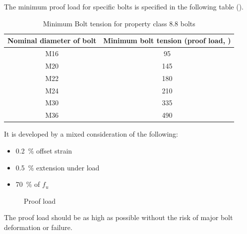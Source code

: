 The minimum proof load for specific bolts is specified in the following table ().
\begin{table}[H]\centering\footnotesize\caption{Minimum Bolt tension for property class 8.8 bolts}
\begin{tabular}{cc}
	\toprule
	Nominal diameter of bolt & Minimum bolt tension (proof load, \si{\kn}) \\ \midrule
	          M16            &                     95                      \\
	          M20            &                     145                     \\
	          M22            &                     180                     \\
	          M24            &                     210                     \\
	          M30            &                     335                     \\
	          M36            &                     490                     \\ \bottomrule
\end{tabular}
\end{table}
It is developed by a mixed consideration of the following:
\begin{itemize}
\item \SI{0.2}{\percent} offset strain
\item \SI{0.5}{\percent} extension under load
\item \SI{70}{\percent} of $f_u$
\end{itemize}
\begin{figure}[H]
\centering
\caption{Proof load}
\end{figure}

The proof load should be as high as possible without the risk of major bolt deformation or failure.
